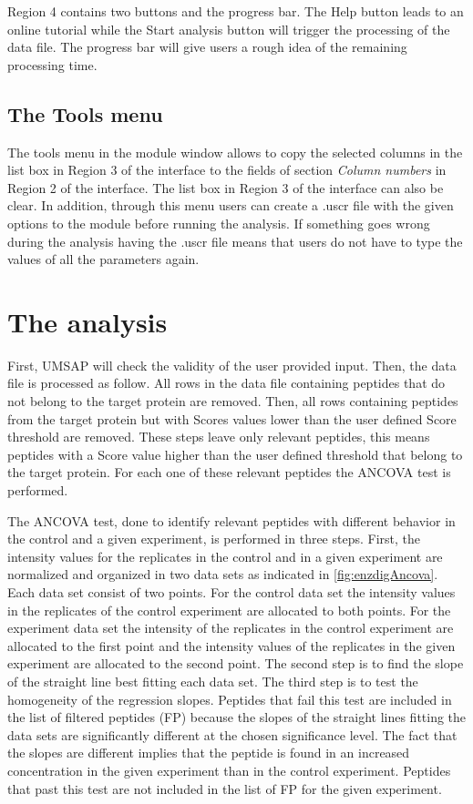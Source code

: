 Region \num{4} contains two buttons and the progress bar. The Help button leads to an online tutorial while the Start analysis button will trigger the processing of the data file. The progress bar will give users a rough idea of the remaining processing time.

\subsection{The Tools menu}

The tools menu in the module window allows to copy the selected columns in the list box in Region \num{3} of the interface to the fields of section \textit{Column numbers} in Region \num{2} of the interface. The list box in Region \num{3} of the interface can also be clear. In addition, through this menu users can create a .uscr file with the given options to the module before running the analysis. If something goes wrong during the analysis having the .uscr file means that users do not have to type the values of all the parameters again.   

\section{The analysis}

First, UMSAP will check the validity of the user provided input. Then, the data file is processed as follow. All rows in the data file containing peptides that do not belong to the target protein are removed. Then, all rows containing peptides from the target protein but with Scores values lower than the user defined Score threshold are removed. These steps leave only relevant peptides, this means peptides with a Score value higher than the user defined threshold that belong to the target protein. For each one of these relevant peptides the ANCOVA test is performed. 

The ANCOVA test, \label{par:ancovatest} done to identify relevant peptides with different behavior in the control and a given experiment, is performed in three steps. First, the intensity values for the replicates in the control and in a given experiment are normalized and organized in two data sets as indicated in \autoref{fig:enzdigAncova}. Each data set consist of two points. For the control data set the intensity values in the replicates of the control experiment are allocated to both points. For the experiment data set the intensity of the replicates in the control experiment are allocated to the first point and the intensity values of the replicates in the given experiment are allocated to the second point. The second step is to find the slope of the straight line best fitting each data set. The third step is to test the homogeneity of the regression slopes. Peptides that fail this test are included in the list of filtered peptides (FP) because the slopes of the straight lines fitting the data sets are significantly different at the chosen significance level. The fact that the slopes are different implies that the peptide is found in an increased concentration in the given experiment than in the control experiment. Peptides that past this test are not included in the list of FP for the given experiment. 

